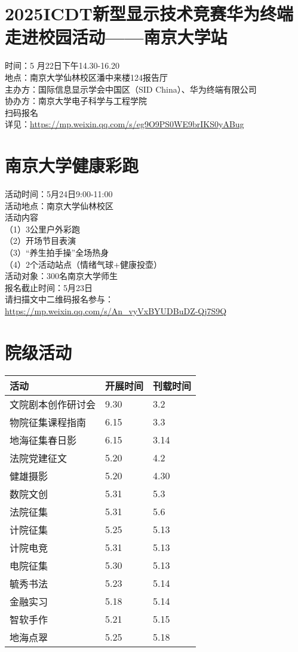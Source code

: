 \documentclass[letterpaper, 12pt]{article}
\begin{document}
\begin{multicols}{2}
\section{2025ICDT新型显示技术竞赛华为终端走进校园活动——南京大学站} %
时间：5 月22日下午14.30-16.20
\\地点：南京大学仙林校区潘中来楼124报告厅
\\主办方：国际信息显示学会中国区（SID China）、华为终端有限公司
\\协办方：南京大学电子科学与工程学院
\\扫码报名
\\详见：\url{https://mp.weixin.qq.com/s/eg9O9PS0WE9brIKS0yABug}

\section{南京大学健康彩跑} %
活动时间：5月24日9:00-11:00
\\活动地点：南京大学仙林校区
\\活动内容
\\（1）3公里户外彩跑
\\（2）开场节目表演
\\（3）“养生拍手操”全场热身
\\（4）2个活动站点（情绪气球+健康投壶）
\\活动对象：300名南京大学师生
\\报名截止时间：5月23日
\\请扫描文中二维码报名参与：\url{https://mp.weixin.qq.com/s/An_vyVxBYUDBuDZ-Qj7S9Q}

\section{院级活动}
\begin{tabular}{|>{\centering\arraybackslash}m{}|m{}|m{}|}
\hline
    活动 & 开展时间 & 刊载时间\\
    \hline\hline
    文院剧本创作研讨会 & 9.30 & 3.2\\
    物院征集课程指南 & 6.15 & 3.3\\
    地海征集春日影 & 6.15 & 3.14\\
    法院党建征文 & 5.20 & 4.2\\
    健雄摄影 & 5.20 & 4.30\\
    数院文创 & 5.31 & 5.3\\
    法院征集 & 5.31 & 5.6\\
    计院征集 & 5.25 & 5.13\\
    计院电竞 & 5.31 & 5.13\\
    电院征集 & 5.30 & 5.13\\
    毓秀书法 & 5.23 & 5.14\\
    金融实习 & 5.18 & 5.14\\
    智软手作 & 5.21 & 5.15\\
    地海点翠 & 5.25 & 5.18\\
    \hline
\end{tabular}

\end{multicols}
\end{document}
